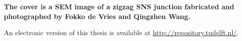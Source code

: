 \begin{titlepage}
\begin{center}
\bigskip
\bigskip

\textbf{The cover is a SEM image of a zigzag SNS junction fabricated and photographed by Fokko de Vries and Qingzhen Wang.}
\bigskip

An electronic version of this thesis is available at \url{http://repository.tudelft.nl/}.
\end{center}


\end{titlepage}

